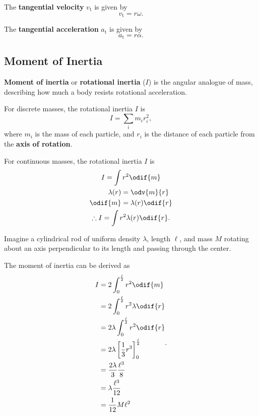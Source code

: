 The \textbf{tangential velocity} \(v_\mathrm{t}\) is given by
\begin{equation}
    v_\mathrm{t} = r \omega.
\end{equation}

The \textbf{tangential acceleration} \(a_\mathrm{t}\) is given by
\begin{equation}
    a_\mathrm{t} = r \alpha.
\end{equation}

\subsection{Moment of Inertia}

\textbf{Moment of inertia} or \textbf{rotational inertia} (\(I\)) is
the angular analogue of mass,
describing how much a body resists rotational acceleration.

For discrete masses, the rotational inertia \(I\) is
\begin{equation}
    I = \sum_i m_i r_i^2,
\end{equation}
where \(m_i\) is the mass of each particle,
and \(r_i\) is the distance of each particle from the \textbf{axis of rotation}.

For continuous masses, the rotational inertia \(I\) is
\begin{gather}
    I = \int r^2 \odif{m} \\
    \begin{aligned}
        \lambda(r) &= \odv{m}{r} \\
        \odif{m} &= \lambda(r) \odif{r}
    \end{aligned} \\
    \therefore I = \int r^2 \lambda(r) \odif{r}.
\end{gather}

Imagine a cylindrical rod of uniform density \(\lambda\), length
\(\ell\), and mass \(M\)
rotating about an axis perpendicular to its length and passing
through the center.

\begin{figure}[ht]
    \centering
    
\end{figure}

The moment of inertia can be derived as
\begin{equation} \label{eq:uniform-rod-rotational-inertia}
    \begin{aligned}
        I &= 2 \int_{0}^{\frac{\ell}{2}} r^2 \odif{m} \\
        &= 2 \int_{0}^{\frac{\ell}{2}} r^2 \lambda \odif{r} \\
        &= 2 \lambda \int_{0}^{\frac{\ell}{2}} r^2 \odif{r} \\
        &= 2 \lambda \left[ \frac{1}{3} r^3 \right]^\frac{\ell}{2}_0 \\
        &= \frac{2 \lambda}{3} \frac{\ell^3}{8} \\
        &= \lambda \frac{\ell^3}{12} \\
        &= \frac{1}{12} M \ell^2
    \end{aligned}.
\end{equation}

